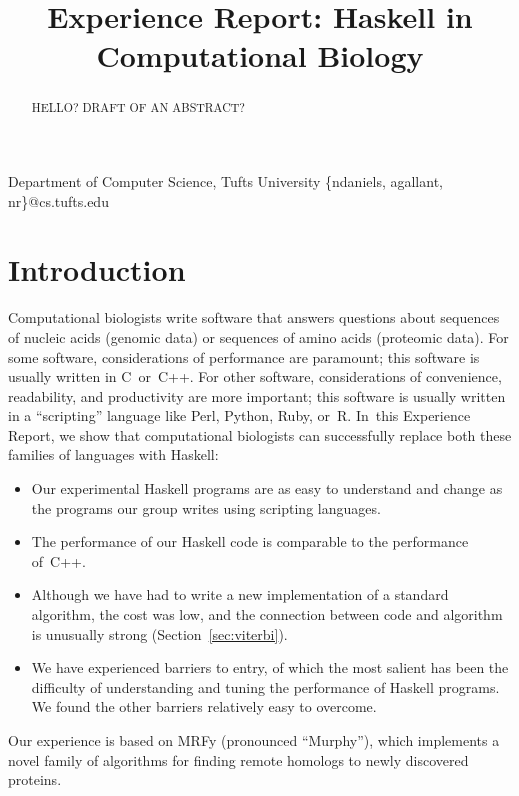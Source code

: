 \documentclass[preprint,nonatbib,blockstyle,nocopyrightspace,times]{sigplanconf}
\newcommand\secref[1]{Section~\ref{sec:#1}}
\begin{document}
\copyrightdata{[to be supplied]} 


\title{Experience Report: Haskell in Computational Biology}

           {Department of Computer Science, Tufts University}
           {\{ndaniels, agallant, nr\}@cs.tufts.edu}


\maketitle

\begin{abstract}
HELLO?  DRAFT OF AN ABSTRACT?
\end{abstract}

% 
% 

\section{Introduction}

Computational biologists write software that answers questions about 
sequences of nucleic acids (genomic data) or sequences of amino 
acids (proteomic data). 
For some software, considerations of performance are paramount; this
software is usually written in C~or~C++. 
For other software, considerations of convenience, readability, and
productivity are more important;
this software is usually written in a ``scripting'' language like
Perl, Python, Ruby, or~R.
In~this Experience Report, we show that computational biologists can
successfully replace both these families of languages with Haskell:
\begin{itemize}
\item
Our experimental Haskell programs are as easy to understand and change
 as the programs our group writes using scripting languages.
\item
The performance of our Haskell code is comparable to the performance
of~C++.
\item
Although we have had to write a new implementation of a standard
algorithm, the cost was low, and the connection between code and
algorithm is unusually strong (\secref{viterbi}).
\item
We have experienced barriers to entry, of which the most salient has been
the difficulty of understanding and tuning  the performance of Haskell
programs. 
We found the other barriers 
relatively easy to overcome.
\end{itemize}
Our experience is based on MRFy (pronounced ``Murphy''), which
implements a novel family of algorithms for finding remote homologs to 
newly discovered proteins. 
\end{document}
